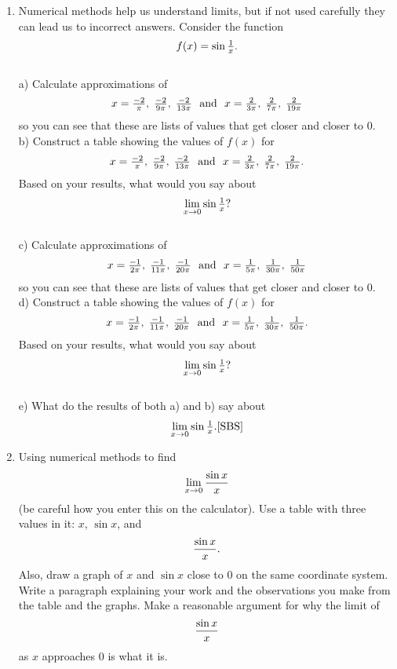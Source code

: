 \begin{enumerate}
\item  Numerical methods help us understand limits, but if not used carefully they can lead us to incorrect answers.  Consider the function $$f(x) = \sin \textstyle{{1 \over x}}.$$\\
a)	Calculate approximations of $$x = {\textstyle{{ - 2} \over \pi }},\;{\textstyle{{ - 2} \over {9\pi }}},\;{\textstyle{{ - 2} \over {13\pi }}}\ \ {\rm{ and }}\ \ x = {\textstyle{2 \over {3\pi }}},\;{\textstyle{2 \over {7\pi }}},\;{\textstyle{2 \over {19\pi }}}$$ so you can see that these are lists of values that get closer and closer to 0.  \\
b)  Construct a table showing the values of $f(x)$ for $$x = {\textstyle{{ - 2} \over \pi }},\;{\textstyle{{ - 2} \over {9\pi }}},\;{\textstyle{{ - 2} \over {13\pi }}}\ \ {\rm{ and }}\ \ x = {\textstyle{2 \over {3\pi }}},\;{\textstyle{2 \over {7\pi }}},\;{\textstyle{2 \over {19\pi }}}.$$  Based on your results, what would you say about $$\mathop {\lim }\limits_{x \to 0} \sin \textstyle{{1 \over x}}?$$ \\
c)  Calculate approximations of $$x = {\textstyle{{ - 1} \over {2\pi }}},\;{\textstyle{{ - 1} \over {11\pi }}},\;{\textstyle{{ - 1} \over {20\pi }}} \ \ {\rm{ and }}\ \ x = {\textstyle{1 \over {5\pi }}},\;{\textstyle{1 \over {30\pi }}},\;{\textstyle{1 \over {50\pi }}}$$ so you can see that these are lists of values that get closer and closer to 0.  \\
d)  Construct a table showing the values of $f(x)$ for $$x = {\textstyle{{ - 1} \over {2\pi }}},\;{\textstyle{{ - 1} \over {11\pi }}},\;{\textstyle{{ - 1} \over {20\pi }}}\ \ {\rm{ and }}\ \ x = {\textstyle{1 \over {5\pi }}},\;{\textstyle{1 \over {30\pi }}},\;{\textstyle{1 \over {50\pi }}}.$$  Based on your results, what would you say about $$\mathop {\lim }\limits_{x \to 0} \sin \textstyle{{1 \over x}}?$$\\
e)	What do the results of both a) and b) say about $$\mathop {\lim }\limits_{x \to 0} \sin \textstyle{{1 \over x}}.  \cite{SBS} $$ 

\item  Using numerical methods to find $$\mathop {\lim }\limits_{x \to 0} {{\sin x} \over x}$$ (be careful how you enter this on the calculator).  Use a table with three values in it:  $x$, $\sin x$, and $${{\sin x} \over x}.$$  Also, draw a graph of $x$ and $\sin x$ close to 0 on the same coordinate system.  Write a paragraph explaining your work and the observations you make from the table and the graphs.  Make a reasonable argument for why the limit of $${{\sin x} \over x}$$ as $x$ approaches 0 is what it is. 


\end{enumerate}

